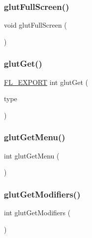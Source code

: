 \mbox{\label{glut_8_h_aa453a4abc530fcdd2ace2284d94681c8}} 
\subsubsection{\texorpdfstring{glut\+Full\+Screen()}{glutFullScreen()}}
{\footnotesize\ttfamily void glut\+Full\+Screen (\begin{DoxyParamCaption}{ }\end{DoxyParamCaption})\hspace{0.3cm}{\ttfamily [inline]}}

\mbox{\label{glut_8_h_ac5b39adb3ed083aca134e42ea22ccea5}} 
\subsubsection{\texorpdfstring{glut\+Get()}{glutGet()}}
{\footnotesize\ttfamily \hyperlink{_fl___export_8_h_aa9ba29a18aee9d738370a06eeb4470fc}{F\+L\+\_\+\+E\+X\+P\+O\+RT} int glut\+Get (\begin{DoxyParamCaption}\item[{G\+Lenum}]{type }\end{DoxyParamCaption})}

\mbox{\label{glut_8_h_a7a1ccbaccbc23ed89b0b9233ab5e3f79}} 
\subsubsection{\texorpdfstring{glut\+Get\+Menu()}{glutGetMenu()}}
{\footnotesize\ttfamily int glut\+Get\+Menu (\begin{DoxyParamCaption}{ }\end{DoxyParamCaption})\hspace{0.3cm}{\ttfamily [inline]}}

\mbox{\label{glut_8_h_aa08fe481b29b5d178f1eeebdc3804f4b}} 
\subsubsection{\texorpdfstring{glut\+Get\+Modifiers()}{glutGetModifiers()}}
{\footnotesize\ttfamily int glut\+Get\+Modifiers (\begin{DoxyParamCaption}{ }\end{DoxyParamCaption})\hspace{0.3cm}{\ttfamily [inline]}}

